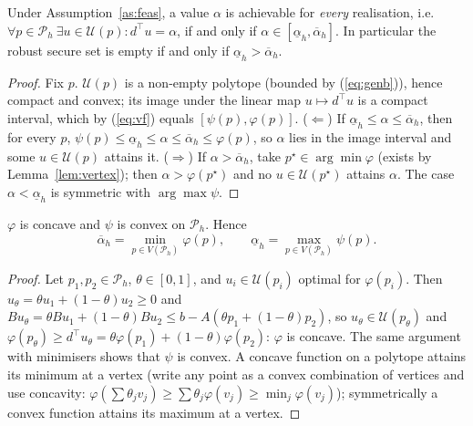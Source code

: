 \begin{theorem}\label{thm:rss}
Under Assumption~\ref{as:feas}, a value $\alpha$ is achievable for \emph{every}
realisation, i.e.\ $\forall p\in\mathcal P_h\ \exists u\in\mathcal U(p): d^\top u=\alpha$, if
and only if $\alpha\in[\underline\alpha_h,\overline\alpha_h]$. In particular the robust
secure set is empty if and only if $\underline\alpha_h>\overline\alpha_h$.
\end{theorem}
\begin{proof}
Fix $p$. $\mathcal U(p)$ is a non-empty polytope (bounded by (\ref{eq:genb})), hence
compact and convex; its image under the linear map $u\mapsto d^\top u$ is a compact
interval, which by (\ref{eq:vf}) equals $[\psi(p),\varphi(p)]$.
($\Leftarrow$) If $\underline\alpha_h\le\alpha\le\overline\alpha_h$, then for every $p$,
$\psi(p)\le\underline\alpha_h\le\alpha\le\overline\alpha_h\le\varphi(p)$, so $\alpha$ lies in the
image interval and some $u\in\mathcal U(p)$ attains it.
($\Rightarrow$) If $\alpha>\overline\alpha_h$, take $p^\star\in\arg\min\varphi$ (exists by
Lemma~\ref{lem:vertex}); then $\alpha>\varphi(p^\star)$ and no $u\in\mathcal U(p^\star)$ attains
$\alpha$. The case $\alpha<\underline\alpha_h$ is symmetric with $\arg\max\psi$.
\end{proof}

\begin{lemma}\label{lem:vertex}
$\varphi$ is concave and $\psi$ is convex on $\mathcal P_h$. Hence
\[
\overline\alpha_h=\min_{p\in V(\mathcal P_h)}\varphi(p),\qquad
\underline\alpha_h=\max_{p\in V(\mathcal P_h)}\psi(p).
\]
\end{lemma}
\begin{proof}
Let $p_1,p_2\in\mathcal P_h$, $\theta\in[0,1]$, and $u_i\in\mathcal U(p_i)$ optimal for
$\varphi(p_i)$. Then $u_\theta=\theta u_1+(1-\theta)u_2\ge0$ and
$Bu_\theta=\theta Bu_1+(1-\theta)Bu_2\le b-A(\theta p_1+(1-\theta)p_2)$, so
$u_\theta\in\mathcal U(p_\theta)$ and $\varphi(p_\theta)\ge d^\top u_\theta=\theta\varphi(p_1)+(1-\theta)\varphi(p_2)$:
$\varphi$ is concave. The same argument with minimisers shows that $\psi$ is convex.
A concave function on a polytope attains its minimum at a vertex (write any point as a
convex combination of vertices and use concavity: $\varphi(\sum\theta_jv_j)\ge\sum\theta_j\varphi(v_j)\ge\min_j\varphi(v_j)$);
symmetrically a convex function attains its maximum at a vertex.
\end{proof}

